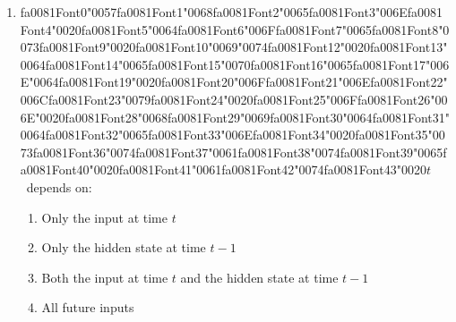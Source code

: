 \documentclass[12pt]{article}
\begin{document}
\begin{enumerate}[label=Q\arabic*.]
\begin{enumerate}[label=(\Alph*)]
    \item The current word given itself
    \item All words simultaneously
\end{enumerate}
\item {\csname fa0081Font0\endcsname\char"0057}{\csname fa0081Font1\endcsname\char"0068}{\csname fa0081Font2\endcsname\char"0065}{\csname fa0081Font3\endcsname\char"006E}{\csname fa0081Font4\endcsname\char"0020}{\csname fa0081Font5\endcsname\char"0064}{\csname fa0081Font6\endcsname\char"006F}{\csname fa0081Font7\endcsname\char"0065}{\csname fa0081Font8\endcsname\char"0073}{\csname fa0081Font9\endcsname\char"0020}{\csname fa0081Font10\endcsname\char"0069}{\char"0074}{\csname fa0081Font12\endcsname\char"0020}{\csname fa0081Font13\endcsname\char"0064}{\csname fa0081Font14\endcsname\char"0065}{\csname fa0081Font15\endcsname\char"0070}{\csname fa0081Font16\endcsname\char"0065}{\csname fa0081Font17\endcsname\char"006E}{\char"0064}{\csname fa0081Font19\endcsname\char"0020}{\csname fa0081Font20\endcsname\char"006F}{\csname fa0081Font21\endcsname\char"006E}{\csname fa0081Font22\endcsname\char"006C}{\csname fa0081Font23\endcsname\char"0079}{\csname fa0081Font24\endcsname\char"0020}{\csname fa0081Font25\endcsname\char"006F}{\csname fa0081Font26\endcsname\char"006E}{\char"0020}{\csname fa0081Font28\endcsname\char"0068}{\csname fa0081Font29\endcsname\char"0069}{\csname fa0081Font30\endcsname\char"0064}{\csname fa0081Font31\endcsname\char"0064}{\csname fa0081Font32\endcsname\char"0065}{\csname fa0081Font33\endcsname\char"006E}{\csname fa0081Font34\endcsname\char"0020}{\csname fa0081Font35\endcsname\char"0073}{\csname fa0081Font36\endcsname\char"0074}{\csname fa0081Font37\endcsname\char"0061}{\csname fa0081Font38\endcsname\char"0074}{\csname fa0081Font39\endcsname\char"0065}{\csname fa0081Font40\endcsname\char"0020}{\csname fa0081Font41\endcsname\char"0061}{\csname fa0081Font42\endcsname\char"0074}{\csname fa0081Font43\endcsname\char"0020}$t$\  depends on:
\begin{enumerate}[label=(\Alph*)]
    \item Only the input at time $t$
    \item Only the hidden state at time $t-1$
    \item Both the input at time $t$ and the hidden state at time $t-1$
    \item All future inputs
\end{enumerate}

\end{enumerate}
\end{document}
